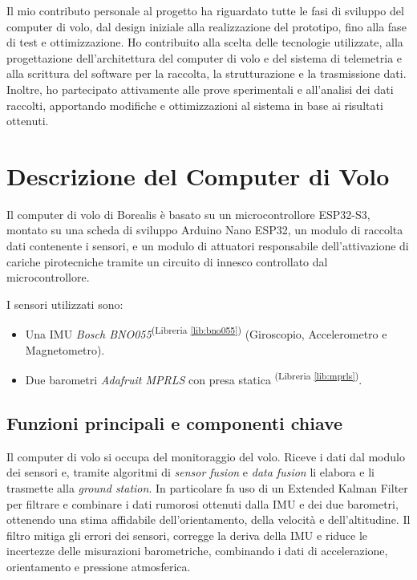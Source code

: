 \documentclass[12pt,a4paper,twoside]{book}
\newcommand{\libref}[1]{\textsuperscript{(Libreria \ref{#1})}}
\begin{document}
Il mio contributo personale al progetto ha riguardato tutte le fasi di sviluppo
del computer di volo, dal design iniziale alla realizzazione del prototipo, fino
alla fase di test e ottimizzazione.
Ho contribuito alla scelta delle tecnologie utilizzate, alla progettazione
dell'architettura del computer di volo e del sistema di telemetria e alla
scrittura del software per la raccolta, la strutturazione e la trasmissione dati.
Inoltre, ho partecipato attivamente alle prove sperimentali e all'analisi dei
dati raccolti, apportando modifiche e ottimizzazioni al sistema in base ai
risultati ottenuti.

\chapter{Descrizione del Computer di Volo} \label{chap:flight-computer}
\pagestyle{plain}

Il computer di volo di Borealis è basato su un microcontrollore ESP32-S3, montato
su una scheda di sviluppo Arduino Nano ESP32, un modulo di raccolta dati contenente
i sensori, e un modulo di attuatori responsabile dell'attivazione di cariche
pirotecniche tramite un circuito di innesco controllato dal microcontrollore.%

I sensori utilizzati sono:
\begin{itemize}
    \item Una \ac{IMU} \emph{Bosch BNO055}\libref{lib:bno055}
          (Giroscopio, Accelerometro e Magnetometro).
    \item Due barometri \emph{Adafruit MPRLS} con presa statica \libref{lib:mprls}.
\end{itemize}
\section{Funzioni principali e componenti chiave}
Il computer di volo si occupa del monitoraggio del volo. Riceve i dati dal modulo
dei sensori e, tramite algoritmi di \emph{sensor fusion} e \emph{data fusion}
li elabora e li trasmette alla \emph{ground station}.
In particolare fa uso di un Extended Kalman Filter per filtrare e combinare i
dati rumorosi ottenuti dalla \ac{IMU} e dei due barometri, ottenendo una stima
affidabile dell'orientamento, della velocità e dell'altitudine.
Il filtro mitiga gli errori dei sensori, corregge la deriva della \ac{IMU} e riduce
le incertezze delle misurazioni barometriche, combinando i dati di accelerazione,
orientamento e pressione atmosferica.
\end{document}
